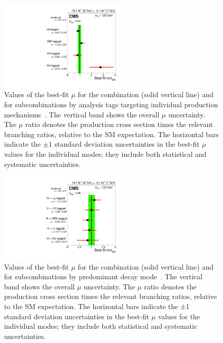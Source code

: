 \begin{figure}[ht]
 \begin{center}
    \includegraphics[width=0.55\textwidth]{figures/intro/sqr_mlz_ccc_mH125_prod.pdf}
      \end{center}
\caption{Values of the best-fit $\mu$ for the combination (solid vertical line) and for
subcombinations by analysis tags targeting individual production mechanisms~\cite{Khachatryan:1979247}.
The vertical band shows the overall $\mu$ uncertainty. The $\mu$ ratio denotes the production cross section times the relevant branching ratios, relative to the SM expectation. The horizontal bars indicate the $\pm 1$ standard deviation uncertainties in the best-fit $\mu$ values for the individual modes; they include both statistical and systematic uncertainties.}
\label{fig:measuredxsec_prod}
\end{figure}

\begin{figure}[ht]
 \begin{center}
    \includegraphics[width=0.55\textwidth]{figures/intro/sqr_mlz_ccc_mH125_decay.pdf}
      \end{center}
\caption{Values of the best-fit $\mu$ for the combination (solid vertical line) and for subcombinations by predominant decay mode~\cite{Khachatryan:1979247}. The vertical band shows the overall $\mu$ uncertainty. The $\mu$ ratio denotes the production cross section times the relevant branching ratios, relative to the SM expectation. The horizontal bars indicate the ±1 standard deviation uncertainties in the best-fit $\mu$ values for the individual modes; they include both statistical and systematic uncertainties.}
\label{fig:measuredxsec_decay}
\end{figure}

